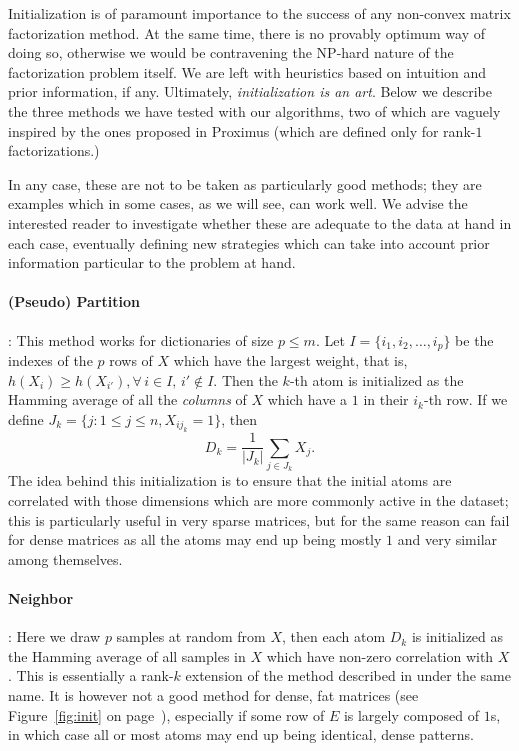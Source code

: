 \documentclass[twocolumn]{IEEEtran}
\theoremstyle{definition}
\begin{document}
Initialization is of paramount importance to the success of any non-convex matrix factorization method. At the same time, there is no provably optimum way of doing so, otherwise we would be contravening the NP-hard nature of the factorization problem itself. We are left with heuristics based on intuition and prior information, if any. Ultimately, \emph{initialization is an art}. Below we describe the three methods we have tested with our algorithms, two of which are vaguely inspired by the ones proposed in Proximus (which are defined only for rank-$1$ factorizations.)

In any case, these are not to be taken as particularly good methods; they are examples which in some cases, as we will see, can work well. We advise the interested reader to investigate whether these are adequate to the data at hand in each case, eventually defining new strategies which can take into account prior information particular to the problem at hand. 

\paragraph{(Pseudo) Partition}: This method works for dictionaries of size $p \leq m$. Let $I=\{i_1,i_2,\ldots,i_p\}$ be the indexes of the $p$ rows of $X$ which have the largest weight, that is, $h(X_i) \geq h(X_{i'}),\forall\,i\in{I},\,i' \notin{I}$. Then the $k$-th atom is initialized as the Hamming average of all the \emph{columns} of $X$ which have a $1$ in their $i_k$-th row. If we define $J_k=\{j:1 \leq j \leq n, X_{ij_k}=1 \}$, then $$D_k = \frac{1}{|J_k|}\sum_{j \in J_k} X_j.$$ 
The idea behind this initialization is to ensure that the initial atoms are correlated with those dimensions which are more commonly active in the dataset; this is particularly useful in very sparse matrices, but for the same reason can fail for dense matrices as all the atoms may end up being mostly $1$ and very similar among themselves.
 
\paragraph{Neighbor}: Here we draw $p$ samples at random from $X$, then each atom $D_k$ is initialized as the Hamming average of all samples in $X$ which have non-zero correlation with $X$. This is essentially a rank-$k$ extension of the method described in \cite{proximus} under the same name. It is however not a good method for dense, fat matrices (see Figure~\ref{fig:init} on page~\pageref{fig:init}), especially if some row of $E$ is largely composed of $1$s, in which case all or most atoms may end up being identical, dense patterns.
\end{document}
